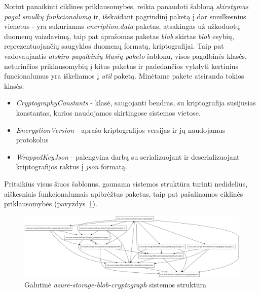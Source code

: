 Norint panaikinti ciklines priklausomybes, reikia panaudoti šabloną \textit{skirstymas pagal smulkų funkcionalumą} ir, išskaidant pagrindinį paketą
į dar smulkesnius vienetus - yra sukuriamas \textit{encription.data} paketas, atsakingas už užkoduotų duomenų vaizdavimą, taip pat
aprašomas paketas \textit{blob} skirtas \textit{blob} esybių, reprezentuojančių saugyklos duomenų formatą, kriptografijai.
Taip pat vadovaujantis \textit{atskiro pagalbinių klasių paketo} šablonu, visos pagalbinės klasės, neturinčios priklausomybių į kitus paketus ir
padedančios vykdyti kertinius funcionalumus yra iškeliamos į \textit{util} paketą.
Minėtame pakete atsiranda tokios klasės:
\begin{itemize}
    \item \textit{CryptographyConstants} - klasė, saugojanti bendras, su kriptografija susijusias konstantas, kurios naudojamos skirtingose sistemos vietose.
    \item \textit{EncryptionVersion} - aprašo kriptografijos versijas ir jų naudojamus protokolus
    \item \textit{WrappedKeyJson} - palengvina darbą su serializuojant ir deserializuojant kriptografijos raktus į \textit{json} formatą.
\end{itemize}

Pritaikius visus šiuos šablonus, gaunama sistemos struktūra turinti nedidelius, aiškesniais funkcionalumais apibrėžtus paketus,
taip pat pašalinamos ciklinės priklausomybės (pavyzdys~\ref{fig:azure_packages_v2}).
\begin{figure}[H]
    \centering
    \includegraphics[scale=0.3]{img/azure_packages_v2}
    \caption{Galutinė \textit{azure-storage-blob-cryptograph} sistemos struktūra}
    \label{fig:azure_packages_v2}
\end{figure}


